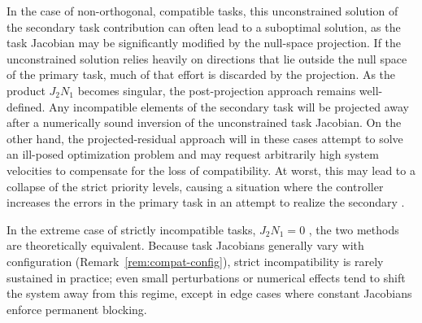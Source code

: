 \documentclass[../main.tex]{subfiles}
\begin{document}
In the case of non-orthogonal, compatible tasks, this unconstrained solution of the secondary task contribution can often lead to a suboptimal solution, as the task Jacobian may be significantly modified by the null-space projection. If the unconstrained solution relies heavily on directions that lie outside the null space of the primary task, much of that effort is discarded by the projection. As the product \( J_2N_1 \) becomes singular, the post-projection approach remains well-defined. Any incompatible elements of the secondary task will be projected away after a numerically sound inversion of the unconstrained task Jacobian. On the other hand, the projected-residual approach will in these cases attempt to solve an ill-posed optimization problem and may request arbitrarily high system velocities to compensate for the loss of compatibility. At worst, this may lead to a collapse of the strict priority levels, causing a situation where the controller increases the errors in the primary task in an attempt to realize the secondary \cite{chiaverini1997, baerlocher1998}. 

In the extreme case of strictly incompatible tasks, \(J_2N_1 = 0\) , the two methods are theoretically equivalent. Because task Jacobians generally vary with configuration (Remark~\ref{rem:compat-config}), strict incompatibility is rarely sustained in practice; even small perturbations or numerical effects tend to shift the system away from this regime, except in edge cases where constant Jacobians enforce permanent blocking.  


\end{document}

